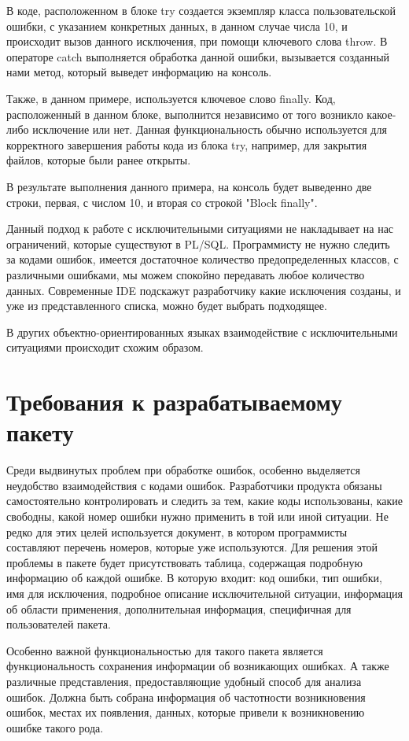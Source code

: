 В коде, расположенном в блоке try создается экземпляр класса пользовательской ошибки, с указанием конкретных данных, в данном случае числа 10, и происходит вызов данного исключения, при помощи ключевого слова throw. В операторе catch выполняется обработка данной ошибки, вызывается созданный нами метод, который выведет информацию на консоль. 

Также, в данном примере, используется ключевое слово finally. Код, расположенный в данном блоке, выполнится независимо от того возникло какое-либо исключение или нет. Данная функциональность обычно используется для корректного завершения работы кода из блока try, например, для закрытия файлов, которые были ранее открыты.

В результате выполнения данного примера, на консоль будет выведенно две строки, первая, с числом 10, и вторая со строкой "Block finally".

Данный подход к работе с исключительными ситуациями не накладывает на нас ограничений, которые существуют в PL/SQL. Программисту не нужно следить за кодами ошибок, имеется достаточное количество предопределенных классов, с различными ошибками, мы можем спокойно передавать любое количество данных. Современные IDE подскажут разработчику какие исключения созданы, и уже из представленного списка, можно будет выбрать подходящее.

В других объектно-ориентированных языках взаимодействие с исключительными ситуациями происходит схожим образом. 


\section{Требования к разрабатываемому пакету}\label{ch2:sec5}

Среди выдвинутых проблем при обработке ошибок, особенно выделяется неудобство взаимодействия с кодами ошибок. Разработчики продукта обязаны самостоятельно контролировать и следить за тем, какие коды использованы, какие свободны, какой номер ошибки нужно применить в той или иной ситуации. Не редко для этих целей используется документ, в котором программисты составляют перечень номеров, которые уже используются. 
Для решения этой проблемы в пакете будет присутствовать таблица, содержащая подробную информацию об каждой ошибке. В которую входит: код ошибки, тип ошибки, имя для исключения, подробное описание исключительной ситуации, информация об области применения, дополнительная информация, специфичная для пользователей пакета. 

Особенно важной функциональностью для такого пакета является функциональность сохранения информации об возникающих ошибках. А также различные представления, предоставляющие удобный способ для анализа ошибок. Должна быть собрана информация об частотности возникновения ошибок, местах их появления, данных, которые привели к возникновению ошибке такого рода. 

